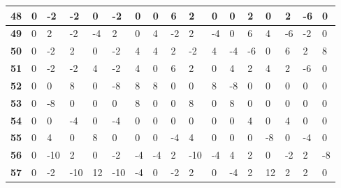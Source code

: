 \begin{longtable}[c]{|l|l|l|l|l|l|l|l|l|l|l|l|l|l|l|l|l|}
\textbf{48} & 0          & -2         & -2         & 0          & -2         & 0          & 0          & 6          & 2          & 0          & 0           & 2           & 0           & 2           & -6          & 0           \\ \hline
\textbf{49} & 0          & 2          & -2         & -4         & 2          & 0          & 4          & -2         & 2          & -4         & 0           & 6           & 4           & -6          & -2          & 0           \\ \hline
\textbf{50} & 0          & -2         & 2          & 0          & -2         & 4          & 4          & 2          & -2         & 4          & -4          & -6          & 0           & 6           & 2           & 8           \\ \hline
\textbf{51} & 0          & -2         & -2         & 4          & -2         & 4          & 0          & 6          & 2          & 0          & 4           & 2           & 4           & 2           & -6          & 0           \\ \hline
\textbf{52} & 0          & 0          & 8          & 0          & -8         & 8          & 8          & 0          & 0          & 8          & -8          & 0           & 0           & 0           & 0           & 0           \\ \hline
\textbf{53} & 0          & -8         & 0          & 0          & 0          & 8          & 0          & 0          & 8          & 0          & 8           & 0           & 0           & 0           & 0           & 0           \\ \hline
\textbf{54} & 0          & 0          & -4         & 0          & -4         & 0          & 0          & 0          & 0          & 0          & 0           & 4           & 0           & 4           & 0           & 0           \\ \hline
\textbf{55} & 0          & 4          & 0          & 8          & 0          & 0          & 0          & -4         & 4          & 0          & 0           & 0           & -8          & 0           & -4          & 0           \\ \hline
\textbf{56} & 0          & -10        & 2          & 0          & -2         & -4         & -4         & 2          & -10        & -4         & 4           & 2           & 0           & -2          & 2           & -8          \\ \hline
\textbf{57} & 0          & -2         & -10        & 12         & -10        & -4         & 0          & -2         & 2          & 0          & -4          & 2           & 12          & 2           & 2           & 0           \\ \hline

\end{longtable}
